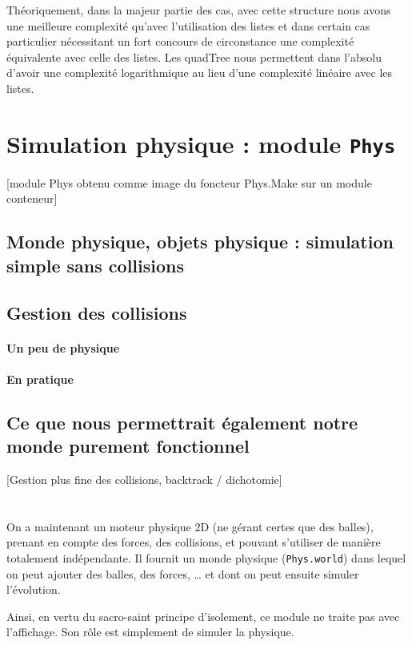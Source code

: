 \documentclass[a4paper]{scrartcl}
\begin{document}
Théoriquement, dans la majeur partie des cas, avec cette structure nous avons une meilleure complexité qu'avec l'utilisation des listes et dans certain cas particulier nécessitant un fort concours de circonstance une complexité équivalente avec celle des listes. Les quadTree nous permettent dans l'absolu d'avoir une complexité logarithmique au lieu d'une complexité linéaire avec les listes.

\section{Simulation physique : module \texttt{Phys}}
[module Phys obtenu comme image du foncteur Phys.Make sur un module
conteneur]
\subsection{Monde physique, objets physique : simulation simple sans
  collisions}
\subsection{Gestion des collisions}
\paragraph{Un peu de physique}
\paragraph{En pratique}
\subsection{Ce que nous permettrait également notre monde purement
  fonctionnel}
[Gestion plus fine des collisions, backtrack / dichotomie]

\section*{}
On a maintenant un moteur physique 2D (ne gérant certes que des
balles), prenant en compte des forces, des collisions, et pouvant
s'utiliser de manière totalement indépendante. Il fournit un monde
physique (\texttt{Phys.world}) dans lequel on peut ajouter des balles,
des forces, … et dont on peut ensuite simuler l'évolution.

Ainsi, en vertu du sacro-saint principe d'isolement, ce module ne
traite pas avec l'affichage. Son rôle est simplement de simuler la
physique.
\end{document}
